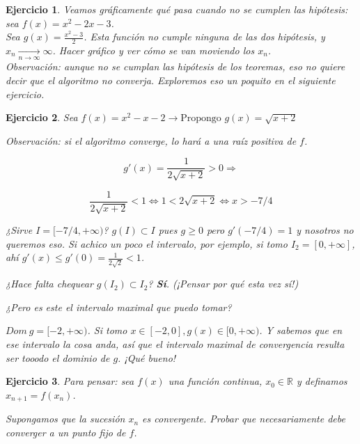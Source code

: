 \documentclass{article}
\newtheorem{exercise}{Ejercicio}
\def\R{\mathbb{R}}
\begin{document}
\begin{exercise}
    Veamos gráficamente qué pasa cuando no se cumplen las hipótesis: sea $f(x) = x^2-2x-3$. \\
    
    Sea $g(x) = \frac{x^2-3}{2}$. Esta función no cumple ninguna de las dos hipótesis, y $x_n \xrightarrow[n \to \infty]{} \infty$. Hacer gráfico y ver cómo se van moviendo los $x_n$.\\
    
    Observación: aunque no se cumplan las hipótesis de los teoremas, eso no quiere decir que el algoritmo no converja. Exploremos eso un poquito en el siguiente ejercicio.
\end{exercise}



\begin{exercise}
    Sea $f(x) = x^2-x-2 \rightarrow \text{Propongo }g(x) = \sqrt{x+2}$
    
    Observación: si el algoritmo converge, lo hará a una raíz positiva de $f$. \bigskip
    
    $$g'(x) = \frac{1}{2\sqrt{x+2}} > 0 \Rightarrow $$
    
    $$\frac{1}{2\sqrt{x+2}} < 1 \Leftrightarrow 1 < 2 \sqrt{x+2} \Leftrightarrow  x > -7/4$$
    
    ¿Sirve $I = [-7/4,+\infty)$? $g(I) \subset I$ pues $g \geq 0$ pero $g'(-7/4) = 1$ y nosotros no queremos eso. Si achico un poco el intervalo, por ejemplo, si tomo $I_2 = [0, +\infty]$, ahí $g'(x) \leq g'(0) = \frac{1}{2\sqrt{2}} < 1$.
    
    ¿Hace falta chequear $g(I_2) \subset I_2$? \textbf{Sí}. (¡Pensar por qué esta vez sí!)
    
    ¿Pero es este el intervalo maximal que puedo tomar?
    
$Dom\ g = [-2,+\infty)$. Si tomo $x \in [-2,0], g(x) \in [0, +\infty)$. Y sabemos que en ese intervalo la cosa anda, así que el intervalo maximal de convergencia resulta ser tooodo el dominio de $g$. ¡Qué bueno!
\end{exercise}

\begin{exercise}

Para pensar: sea $f(x)$ una función continua, $x_0 \in \R$ y definamos $x_{n+1} = f(x_n)$.

Supongamos que la sucesión $x_n$ es convergente. Probar que necesariamente debe converger a un punto fijo de $f$.

\end{exercise}
\end{document}
